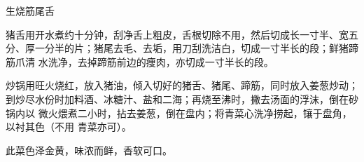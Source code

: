 %
%
%
%
%
%
%
\begin{recipe}{生烧筋尾舌}

\ingredients


\preparation

\step 猪舌用开水煮约十分钟，刮净舌上粗皮，舌根切除不用，然后切成长一寸半、宽五
分、厚一分半的片；猪尾去毛、去垢，用刀刮洗洁白，切成一寸半长的段；鲜猪蹄筋爪清
水洗净，去掉蹄筋前边的痩肉，亦切成一寸半长的段。

\step 炒锅用旺火烧红，放入猪油，倾入切好的猪舌、猪尾、蹄筋，同时放入姜葱炒动；
到炒尽水份时加料酒、冰糖汁、盐和二海；再烧至沸时，撇去汤面的浮沫，倒在砂锅内以
微火煨煮二小时，拈去姜葱，倒在盘内；将青菜心洗净捞起，镶于盘角，以衬其色（不用
青菜亦可）。

\features

此菜色泽金黄，味浓而鲜，香软可口。

\end{recipe}

